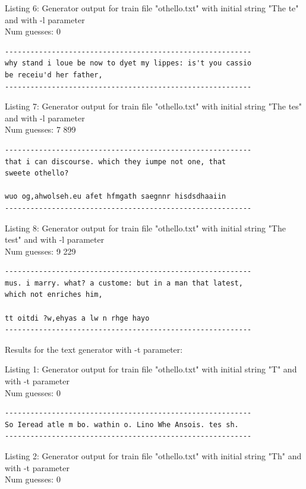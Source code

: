 \documentclass{article}
\begin{document}
Listing 6: Generator output for train file "othello.txt" with initial string "The te" and with -l parameter
\\Num guesses: 0

\begin{lstlisting}
----------------------------------------------------------
why stand i loue be now to dyet my lippes: is't you cassio 
be receiu'd her father,
----------------------------------------------------------
\end{lstlisting}

Listing 7: Generator output for train file "othello.txt" with initial string "The tes" and with -l parameter
\\Num guesses: 7 899

\begin{lstlisting}
----------------------------------------------------------
that i can discourse. which they iumpe not one, that 
sweete othello?

wuo og,ahwolseh.eu afet hfmgath saegnnr hisdsdhaaiin
----------------------------------------------------------
\end{lstlisting}

Listing 8: Generator output for train file "othello.txt" with initial string "The test" and with -l parameter
\\Num guesses: 9 229

\begin{lstlisting}
----------------------------------------------------------
mus. i marry. what? a custome: but in a man that latest, 
which not enriches him,

tt oitdi ?w,ehyas a lw n rhge hayo
----------------------------------------------------------
\end{lstlisting}



Results for the text generator with -t parameter:


\hfill

Listing 1: Generator output for train file "othello.txt" with initial string "T" and with -t parameter
\\Num guesses: 0

\begin{lstlisting}
----------------------------------------------------------
So Ieread atle m bo. wathin o. Lino Whe Ansois. tes sh.
----------------------------------------------------------
\end{lstlisting}

Listing 2: Generator output for train file "othello.txt" with initial string "Th" and with -t parameter
\\Num guesses: 0
\end{document}
